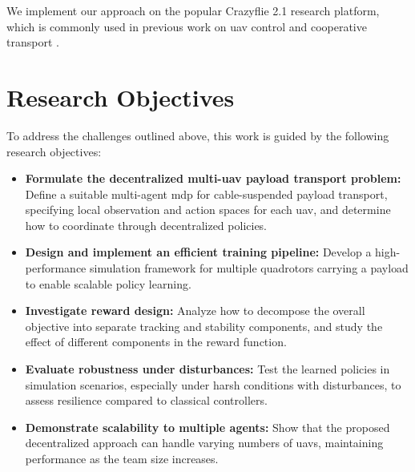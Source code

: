 We implement our approach on the popular Crazyflie 2.1 research platform, which is commonly used in previous work on \gls{uav} control and cooperative transport \autocite{Wahba2024,huang_collision_2024,eschmann_learning_2024,chen_what_2024}.
\section{Research Objectives}
To address the challenges outlined above, this work is guided by the following research objectives:
\begin{itemize}
    \item \textbf{Formulate the decentralized multi-\gls{uav} payload transport problem:} Define a suitable multi-agent \gls{mdp} for cable-suspended payload transport, specifying local observation and action spaces for each \gls{uav}, and determine how to coordinate through decentralized policies.
    \item \textbf{Design and implement an efficient training pipeline:} Develop a high-performance simulation framework for multiple quadrotors carrying a payload to enable scalable policy learning.
    \item \textbf{Investigate reward design:} Analyze how to decompose the overall objective into separate tracking and stability components, and study the effect of different components in the reward function.
    \item \textbf{Evaluate robustness under disturbances:} Test the learned policies in simulation scenarios, especially under harsh conditions with disturbances, to assess resilience compared to classical controllers.
    \item \textbf{Demonstrate scalability to multiple agents:} Show that the proposed decentralized approach can handle varying numbers of \glspl{uav}, maintaining performance as the team size increases.
\end{itemize}
